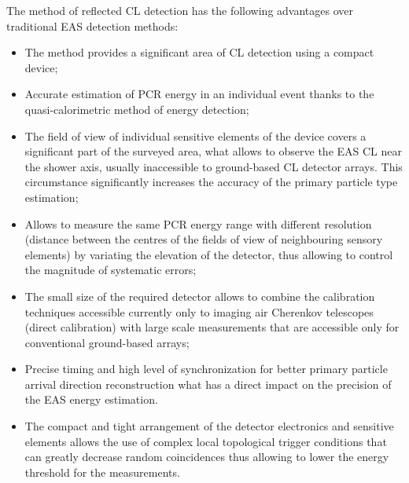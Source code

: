 \documentclass[a4paper]{jpconf}
\begin{document}
The method of reflected CL detection has the following advantages over traditional EAS detection methods:
\begin{itemize}
\item The method provides a significant area of CL detection using a compact device;
\item Accurate estimation of PCR energy in an individual event thanks to the quasi-calorimetric method of energy detection;
\item The field of view of individual sensitive elements of the device covers a significant part of the surveyed area, what allows to observe the EAS CL near the shower axis, usually inaccessible to ground-based CL detector arrays. This circumstance significantly increases the accuracy of the primary particle type estimation;
\item Allows to measure the same PCR energy range with different resolution (distance between the centres of the fields of view of neighbouring sensory elements) by variating the elevation of the detector, thus allowing to control the magnitude of systematic errors;
\item The small size of the required detector allows to combine the calibration techniques accessible currently only to imaging air Cherenkov telescopes (direct calibration) with large scale measurements that are accessible only for conventional ground-based arrays;
\item Precise timing and high level of synchronization for better primary particle arrival direction reconstruction what has a direct impact on the precision of the EAS energy estimation.
\item The compact and tight arrangement of the detector electronics and sensitive elements allows the use of complex local topological trigger conditions that can greatly decrease random coincidences thus allowing to lower the energy threshold for the measurements.
\end{itemize}
\end{document}
